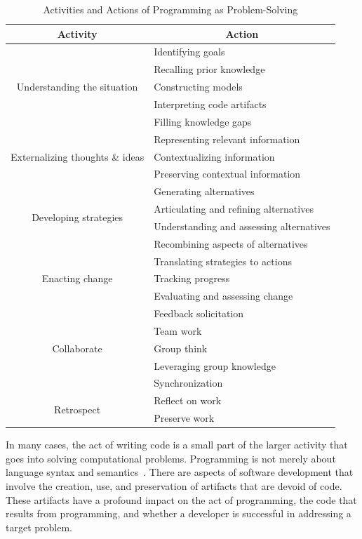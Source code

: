 \documentclass{ppig}
\begin{document}
\begin{table}[!htbp]
\caption{Activities and Actions of Programming as Problem-Solving}
\label{matrix}
\centering
\begin{tabular}{|c|l|}
	\hline
	\multicolumn{1}{|c|}{\textbf{Activity}} 
	& \multicolumn{1}{c|}{\textbf{Action}}\\\hline
	\multirow{5}{*}{Understanding the situation} 
	& Identifying goals \\\cline{2-2}
	& Recalling prior knowledge \\\cline{2-2}
	& Constructing models \\\cline{2-2}
	& Interpreting code artifacts \\\cline{2-2}
	& Filling knowledge gaps \\\hline
	\multirow{3}{*}{Externalizing thoughts \& ideas} 
	& Representing relevant information \\\cline{2-2}
	& Contextualizing information \\\cline{2-2}
	& Preserving contextual information \\\hline
	\multirow{4}{*}{Developing strategies} 
	& Generating alternatives \\\cline{2-2}
	& Articulating and refining alternatives \\\cline{2-2}
	& Understanding and assessing alternatives \\\cline{2-2}
	& Recombining aspects of alternatives \\\hline
	\multirow{3}{*}{Enacting change} 
	& Translating strategies to actions \\\cline{2-2}
	& Tracking progress \\\cline{2-2}
	& Evaluating and assessing change \\\hline
	\multirow{5}{*}{Collaborate} 
	& Feedback solicitation \\\cline{2-2}
	& Team work \\\cline{2-2}
	& Group think \\\cline{2-2}
	& Leveraging group knowledge \\\cline{2-2}
	& Synchronization \\\hline
	\multirow{2}{*}{Retrospect} 
	& Reflect on work \\\cline{2-2}
	& Preserve work \\\hline
\end{tabular}
\end{table}

In many cases, the act of writing code is a small part of the larger activity that goes into solving computational problems.
Programming is not merely about language syntax and semantics~\cite{loksa2016programming}.
There are aspects of software development that involve the creation, use, and preservation of artifacts that are devoid of code.
These artifacts have a profound impact on the act of programming, the code that results from programming, and whether a developer is successful in addressing a target problem.
\end{document}
